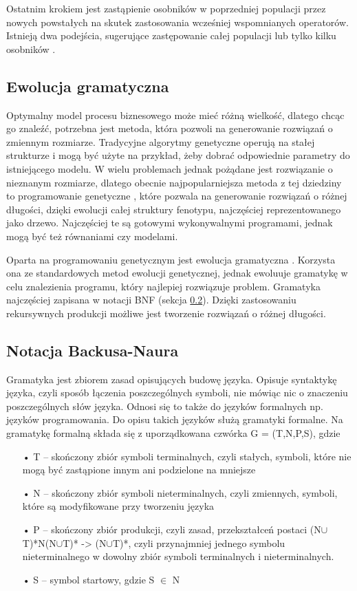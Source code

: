 Ostatnim krokiem jest zastąpienie osobników w poprzedniej populacji przez nowych powstałych na skutek zastosowania wcześniej wspomnianych operatorów. Istnieją dwa podejścia, sugerujące zastępowanie całej populacji lub tylko kilku osobników \cite{SSvsGen}.


\subsection{Ewolucja gramatyczna}
Optymalny model procesu biznesowego może mieć różną wielkość, dlatego chcąc go znaleźć, potrzebna jest metoda, która pozwoli na generowanie rozwiązań o zmiennym rozmiarze. Tradycyjne algorytmy genetyczne operują na stałej strukturze i mogą być użyte na przykład, żeby dobrać odpowiednie parametry do istniejącego modelu. W wielu problemach jednak pożądane jest rozwiązanie o nieznanym rozmiarze, dlatego obecnie najpopularniejsza metoda z tej dziedziny to programowanie genetyczne \cite{Koza:1990:pat-GAsp}\cite{10.5555/138936}, które pozwala na generowanie rozwiązań o różnej długości, dzięki ewolucji całej struktury fenotypu, najczęściej reprezentowanego jako drzewo. Najczęściej te są gotowymi wykonywalnymi programami, jednak mogą być też równaniami czy modelami.

Oparta na programowaniu genetycznym jest ewolucja gramatyczna \cite{ryan_collins_neill_1998}. Korzysta ona ze standardowych metod ewolucji genetycznej, jednak ewoluuje gramatykę w celu znalezienia programu, który najlepiej rozwiązuje problem. Gramatyka najczęściej zapisana w notacji BNF (sekcja \ref{sec:BNF}). Dzięki zastosowaniu rekursywnych produkcji możliwe jest tworzenie rozwiązań o różnej długości. 

\subsection{Notacja Backusa-Naura}
\label{sec:BNF}
Gramatyka jest zbiorem zasad opisujących budowę języka. Opisuje syntaktykę języka, czyli sposób łączenia poszczególnych symboli, nie mówiąc nic o znaczeniu poszczególnych słów języka. Odnosi się to także do języków formalnych np. języków programowania. Do opisu takich języków służą gramatyki formalne. Na gramatykę formalną składa się z uporządkowana czwórka G = (T,N,P,S), gdzie 

\begin{itemize}
  \item[•] T -- skończony zbiór symboli terminalnych, czyli stałych, symboli, które nie mogą być zastąpione innym ani podzielone na mniejsze 
  \item[•] N -- skończony zbiór symboli nieterminalnych, czyli zmiennych, symboli, które są modyfikowane przy tworzeniu języka
  \item[•] P -- skończony zbiór produkcji, czyli zasad, przekształceń postaci (N$\cup$T)*N(N$\cup$T)* -> (N$\cup$T)*, czyli przynajmniej jednego symbolu nieterminalnego w dowolny zbiór symboli terminalnych i nieterminalnych.
  \item[•] S -- symbol startowy, gdzie S $\in$ N
\end{itemize}

